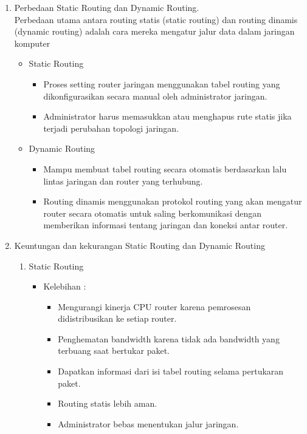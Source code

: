 \begin{enumerate}
	\item Perbedaan Static Routing dan Dynamic Routing.
	\\ Perbedaan utama antara routing statis (static routing) dan routing dinamis (dynamic routing) adalah cara mereka mengatur jalur data dalam jaringan komputer
	\begin{itemize}
		\item Static Routing
		\begin{itemize}
			\item Proses setting router jaringan menggunakan tabel routing yang dikonfigurasikan secara manual oleh administrator jaringan.
			\item Administrator harus memasukkan atau menghapus rute statis jika terjadi perubahan topologi jaringan.
		\end{itemize}

		\item Dynamic Routing
		\begin{itemize}
			\item Mampu membuat tabel routing secara otomatis berdasarkan lalu lintas jaringan dan router yang terhubung.
			\item Routing dinamis menggunakan protokol routing yang akan mengatur router secara otomatis untuk saling berkomunikasi dengan memberikan informasi tentang jaringan dan koneksi antar router.
		\end{itemize}

		
	\end{itemize}

	\item Keuntungan dan kekurangan Static Routing dan Dynamic Routing
	\begin{enumerate}
		\item Static Routing
		\begin{itemize}
			\item Kelebihan :
			\begin{itemize}
				\item[\ding{58}] Mengurangi kinerja CPU router karena pemrosesan didistribusikan ke setiap router.
				\item[\ding{58}] Penghematan bandwidth karena tidak ada bandwidth yang terbuang saat bertukar paket.
				\item[\ding{58}] Dapatkan informasi dari isi tabel routing selama pertukaran paket.
				\item[\ding{58}] Routing statis lebih aman.
				\item[\ding{58}] Administrator bebas menentukan jalur jaringan.
			\end{itemize}


\end{itemize}
\end{enumerate}
\end{enumerate}
